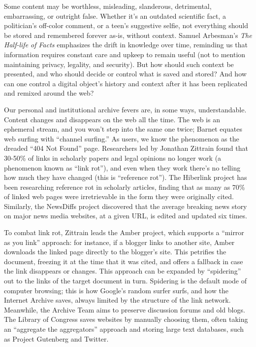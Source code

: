 Some content may be worthless, misleading, slanderous, detrimental, embarrassing, or outright false. Whether it's an outdated scientific fact, a politician's off-color comment, or a teen's suggestive selfie, not everything should be stored and remembered forever as-is, without context. Samuel Arbesman's \emph{The Half-life of Facts} emphasizes the drift in knowledge over time, reminding us that information requires constant care and upkeep to remain useful (not to mention maintaining privacy, legality, and security).\autocite{arbesman_half-life_2012} But how should such context be presented, and who should decide or control what is saved and stored? And how can one control a digital object's history and context after it has been replicated and remixed around the web?

Our personal and institutional archive fevers are, in some ways, understandable. Content changes and disappears on the web all the time. The web is an ephemeral stream, and you won't step into the same one twice; Barnet equates web surfing with ``channel surfing.''\autocite[217]{barnet_pack-rat_2001} As users, we know the phenomenon as the dreaded ``404 Not Found'' page. Researchers led by Jonathan Zittrain found that 30-50\% of links in scholarly papers and legal opinions no longer work (a phenomenon known as ``link rot''), and even when they work there's no telling how much they have changed (this is ``reference rot'').\autocite{zittrain_perma:_2013} The Hiberlink project has been researching reference rot in scholarly articles, finding that as many as 70\% of linked web pages were irretrievable in the form they were originally cited.\autocite{http://www.lanl.gov/discover/news-release-archive/2015/January/01.26-scholarly-articles-affected-by-reference-rot.php} Similarly, the NewsDiffs project discovered that the average breaking news story on major news media websites, at a given URL, is edited and updated six times.\autocite{NewsDiffs; check this figure}

To combat link rot, Zittrain leads the Amber project, which supports a ``mirror as you link'' approach: for instance, if a blogger links to another site, Amber downloads the linked page directly to the blogger's site.\autocite{https://cyber.law.harvard.edu/node/92313} This petrifies the document, freezing it at the time that it was cited, and offers a fallback in case the link disappears or changes. This approach can be expanded by ``spidering'' out to the links of the target document in turn. Spidering is the default mode of computer browsing; this is how Google's random surfer surfs, and how the Internet Archive saves, always limited by the structure of the link network. Meanwhile, the Archive Team aims to preserve discussion forums and old blogs. The Library of Congress saves websites by manually choosing them, often taking an ``aggregate the aggregators'' approach and storing large text databases, such as Project Gutenberg and Twitter.

